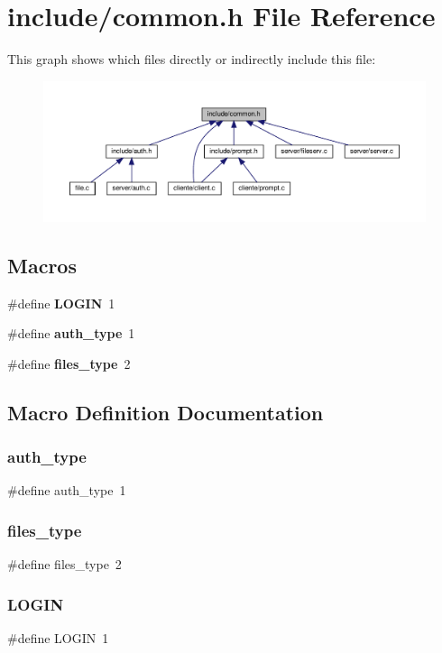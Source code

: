 \section{include/common.h File Reference}
\label{common_8h}
This graph shows which files directly or indirectly include this file\+:\nopagebreak
\begin{figure}[H]
\begin{center}
\leavevmode
\includegraphics[width=350pt]{common_8h__dep__incl}
\end{center}
\end{figure}
\subsection*{Macros}
\begin{DoxyCompactItemize}
\item 
\#define \textbf{ L\+O\+G\+IN}~1
\item 
\#define \textbf{ auth\+\_\+type}~1
\item 
\#define \textbf{ files\+\_\+type}~2
\end{DoxyCompactItemize}


\subsection{Macro Definition Documentation}
\mbox{\label{common_8h_aeccf496f78c1193cbacd50d37bf8fa2d}} 
\subsubsection{auth\+\_\+type}
{\footnotesize\ttfamily \#define auth\+\_\+type~1}

\mbox{\label{common_8h_a06ecdafe3df3478eab750a18f6f8371d}} 
\subsubsection{files\+\_\+type}
{\footnotesize\ttfamily \#define files\+\_\+type~2}

\mbox{\label{common_8h_a2cc44bf853cfd679b56807b198735596}} 
\subsubsection{L\+O\+G\+IN}
{\footnotesize\ttfamily \#define L\+O\+G\+IN~1}

